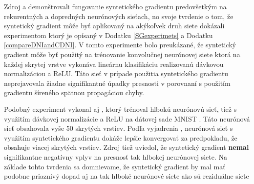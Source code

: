 Zdroj \cite{Jaderberg2016} a \cite{Czarnecki2017} demonštrovali fungovanie syntetického gradientu predovšetkým na rekurentných a dopredných neurónových sieťach, no svoje tvrdenie o tom, že syntetický gradient môže byť aplikovaný na akýkoľvek druh siete dokázali experimentom ktorý je opísaný v Dodatku \ref{SGexperimets} a Dodatku \ref{compareDNIandCDNI}. V tomto experimente bolo preukázané, že syntetický gradient môže byť použitý na trénovanie konvolučnej neurónovej siete ktorá na každej skrytej vrstve vykonáva lineárnu klasifikáciu realizovanú dávkovou normalizáciou a ReLU. Táto sieť v prípade použitia syntetického gradientu neprejavovala žiadne signifikantné úpadky presnosti v porovnaní s použitím gradientu šíreného spätnou propagáciou chyby.

Podobný experiment vykonal aj \cite{Czarnecki2017}, ktorý trénoval hlbokú neurónovú sieť, tiež s využitím dávkovej normalizácie a ReLU na dátovej sade MNIST \cite{yann1998mnist}. Táto neurónová sieť obsahovala vyše 50 skrytých vrstiev. Podľa vyjadrenia \cite{Czarnecki2017}, neurónová sieť s využitím syntetického gradientu dokáže lepšie konvergovať za predpokladu, že obsahuje viacej skrytých vrstiev. Zdroj \cite{Czarnecki2017} tiež uviedol, že syntetický gradient \textbf{nemal} signifikantne negatívny vplyv na presnosť tak hlbokej neurónovej siete. Na základe tohto tvrdenia sa domnievame, že syntetický gradient by mal mať podobne priaznivý dopad aj na tak hlboké neurónové siete ako sú reziduálne siete